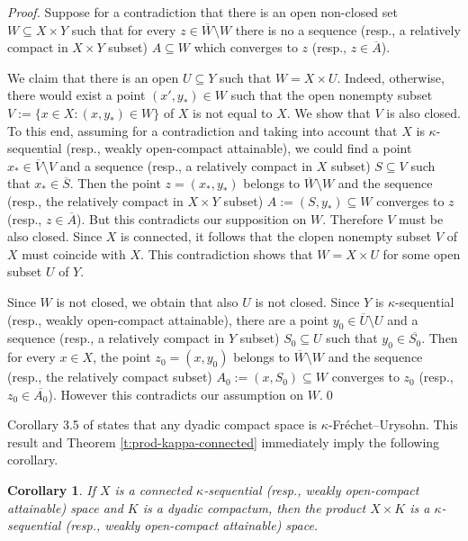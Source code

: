 \documentclass[preprint,11pt]{elsarticle}
\newtheorem{corollary}[theorem]{Corollary}
\numberwithin{equation}{section}
\numberwithin{theorem}{section}
\newcommand{\SM}{{\setminus}}
\begin{document}
\begin{proof}
Suppose for a contradiction that there is an open non-closed set $W\subseteq X\times Y$ such that for every $z\in \overline{W}\SM W$ there is no a sequence (resp., a relatively compact in  $X\times Y$ subset) $A\subseteq W$ which converges to $z$ (resp.,  $z\in \overline{A}$).

We claim that there is an open $U\subseteq Y$ such that $W=X\times U$. Indeed, otherwise, there would exist a point $(x',y_\ast)\in W$ such that the open nonempty subset $V:=\{x\in X: (x,y_\ast)\in W\}$ of $X$ is not equal to $X$. We show that $V$ is also closed. To this end, assuming for a contradiction and taking into account that $X$ is $\kappa$-sequential (resp., weakly open-compact attainable), we could find a point $x_\ast\in \overline{V}\SM V$ and a sequence (resp., a relatively compact in $X$ subset) $S\subseteq V$ such that $x_\ast\in \overline{S}$. Then the point $z=(x_\ast,y_\ast)$ belongs to $\overline{W}\SM W$ and the sequence (resp., the relatively compact in  $X\times Y$ subset) $A:=(S,y_\ast)\subseteq W$ converges to $z$ (resp.,  $z\in \overline{A}$). But this contradicts our supposition on $W$. Therefore $V$ must be also closed. Since $X$ is connected, it follows that the clopen nonempty subset $V$ of $X$ must coincide with $X$. This contradiction shows that $W=X\times U$ for some open subset $U$ of $Y$.

Since $W$ is not closed, we obtain that also $U$ is not closed. Since $Y$ is $\kappa$-sequential (resp., weakly open-compact attainable), there are a point $y_0\in \overline{U}\SM U$ and a sequence (resp., a relatively compact in $Y$ subset) $S_0\subseteq U$ such that $y_0\in \overline{S_0}$. Then for every $x\in X$, the point $z_0=(x,y_0)$ belongs to $\overline{W}\SM W$ and the sequence (resp., the relatively compact subset) $A_0:=(x,S_0)\subseteq W$ converges to $z_0$ (resp.,  $z_0\in \overline{A_0}$). However this contradicts our assumption on $W$.\qed
\end{proof}

Corollary 3.5 of \cite{LiL} states that any dyadic compact space is $\kappa$-Fr\'{e}chet--Urysohn. This result and Theorem \ref{t:prod-kappa-connected} immediately imply the following corollary.
\begin{corollary} \label{c:k-sequential-dyadic}
If $X$ is a connected $\kappa$-sequential {\rm(}resp., weakly open-compact attainable{\rm)} space and $K$ is a dyadic compactum, then the product $X\times K$ is a $\kappa$-sequential {\rm(}resp., weakly open-compact attainable{\rm)} space.
\end{corollary}
\end{document}

